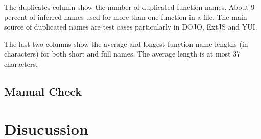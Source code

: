 \documentclass[10pt, preprint]{sigplanconf}
\begin{document}
{The duplicates column show the number of duplicated function names. About 9 percent of inferred names used for more than one function in a file. The main source of duplicated names are test cases particularly in DOJO, ExtJS and YUI. 

The last two columns show the average and longest function name lengths (in characters) for both short and full names. The average length is at most 37 characters.


\subsection{Manual Check}

   

\section{Disucussion}

}
\end{document}
